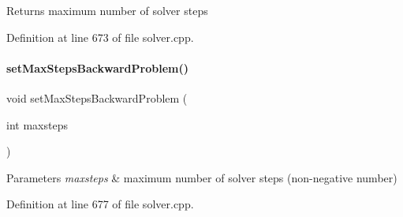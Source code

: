 \begin{DoxyReturn}{Returns}
maximum number of solver steps 
\end{DoxyReturn}


Definition at line 673 of file solver.\+cpp.

\mbox{\label{classamici_1_1_solver_aa1d39cd744f489c17c3497c98acb7f59}} 
\paragraph{\texorpdfstring{set\+Max\+Steps\+Backward\+Problem()}{setMaxStepsBackwardProblem()}}
{\footnotesize\ttfamily void set\+Max\+Steps\+Backward\+Problem (\begin{DoxyParamCaption}\item[{int}]{maxsteps }\end{DoxyParamCaption})}


\begin{DoxyParams}{Parameters}
{\em maxsteps} & maximum number of solver steps (non-\/negative number) \\
\hline
\end{DoxyParams}


Definition at line 677 of file solver.\+cpp.

